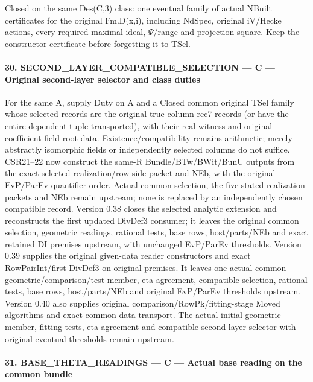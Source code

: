 Closed on the same Des(C,3) class: one eventual family of actual NBuilt certificates for the original Fm.D(x,i), including NdSpec, original iV/\allowbreak{}Hecke actions, every required maximal ideal, $\Psi$/\allowbreak{}range and projection square. Keep the constructor certificate before forgetting it to TSel.

\paragraph{30. SECOND\_\allowbreak{}LAYER\_\allowbreak{}COMPATIBLE\_\allowbreak{}SELECTION — C — Original second-layer selector and class duties}

For the same A, supply Duty on A and a Closed common original TSel family whose selected records are the original true-column rec7 records (or have the entire dependent tuple transported), with their real witness and original coefficient-field root data. Existence/\allowbreak{}compatibility remains arithmetic; merely abstractly isomorphic fields or independently selected columns do not suffice. CSR21–22 now construct the same-R Bundle/\allowbreak{}BTw/\allowbreak{}BWit/\allowbreak{}BunU outputs from the exact selected realization/\allowbreak{}row-side packet and NEb, with the original EvP/\allowbreak{}ParEv quantifier order. Actual common selection, the five stated realization packets and NEb remain upstream; none is replaced by an independently chosen compatible record. Version 0.38 closes the selected analytic extension and reconstructs the first updated DivDef3 consumer; it leaves the original common selection, geometric readings, rational tests, base rows, host/\allowbreak{}parts/\allowbreak{}NEb and exact retained DI premises upstream, with unchanged EvP/\allowbreak{}ParEv thresholds. Version 0.39 supplies the original given-data reader constructors and exact RowPairInt/\allowbreak{}first DivDef3 on original premises. It leaves one actual common geometric/\allowbreak{}comparison/\allowbreak{}test member, eta agreement, compatible selection, rational tests, base rows, host/\allowbreak{}parts/\allowbreak{}NEb and original EvP/\allowbreak{}ParEv thresholds upstream. Version 0.40 also supplies original comparison/\allowbreak{}RowPk/\allowbreak{}fitting-stage Moved algorithms and exact common data transport. The actual initial geometric member, fitting tests, eta agreement and compatible second-layer selector with original eventual thresholds remain upstream.

\paragraph{31. BASE\_\allowbreak{}THETA\_\allowbreak{}READINGS — C — Actual base reading on the common bundle}

